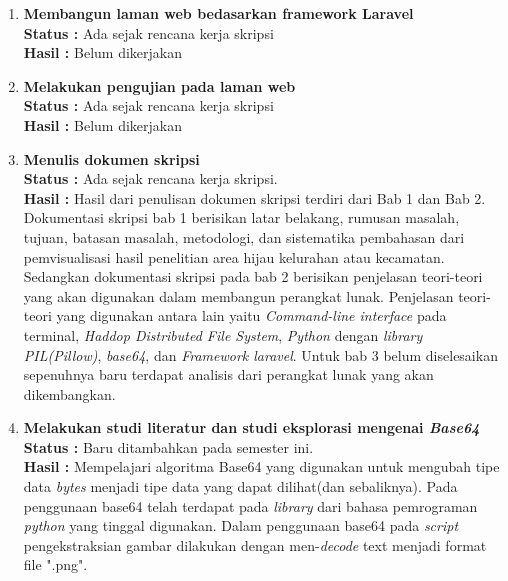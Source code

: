 \documentclass[a4paper,twoside]{article}
\begin{document}
\begin{enumerate}
		\item \textbf{Membangun laman web bedasarkan framework Laravel}\\
		{\bf Status :} Ada sejak rencana kerja skripsi \\
		{\bf Hasil :} Belum dikerjakan
		
		\item \textbf{Melakukan pengujian pada laman web}\\
		{\bf Status :} Ada sejak rencana kerja skripsi \\
		{\bf Hasil :} Belum dikerjakan
		
		\item \textbf{Menulis dokumen skripsi}\\
		{\bf Status :} Ada sejak rencana kerja skripsi.\\
		{\bf Hasil :} Hasil dari penulisan dokumen skripsi terdiri dari Bab 1 dan Bab 2. Dokumentasi skripsi bab 1 berisikan latar belakang, rumusan masalah, tujuan, batasan masalah, metodologi, dan sistematika pembahasan dari pemvisualisasi hasil penelitian area hijau kelurahan atau kecamatan. Sedangkan dokumentasi skripsi pada bab 2 berisikan penjelasan teori-teori yang akan digunakan dalam membangun perangkat lunak. Penjelasan teori-teori yang digunakan antara lain yaitu \textit{Command-line interface} pada terminal, \textit{Haddop Distributed File System}, \textit{Python} dengan \textit{library PIL(Pillow)}, \textit{base64}, dan \textit{Framework laravel}. Untuk bab 3 belum diselesaikan sepenuhnya baru terdapat analisis dari perangkat lunak yang akan dikembangkan.

		\item \textbf{Melakukan studi literatur dan studi eksplorasi mengenai \textit{Base64}}\\
		{\bf Status :} Baru ditambahkan pada semester ini.\\
		{\bf Hasil :} Mempelajari algoritma Base64 yang digunakan untuk mengubah tipe data \textit{bytes} menjadi tipe data yang dapat dilihat(dan sebaliknya). Pada penggunaan base64 telah terdapat pada \textit{library} dari bahasa pemrograman \textit{python} yang tinggal digunakan. Dalam penggunaan base64 pada \textit{script} pengekstraksian gambar dilakukan dengan men-\textit{decode} text menjadi format file ".png".
	\end{enumerate}
\newpage
\end{document}
